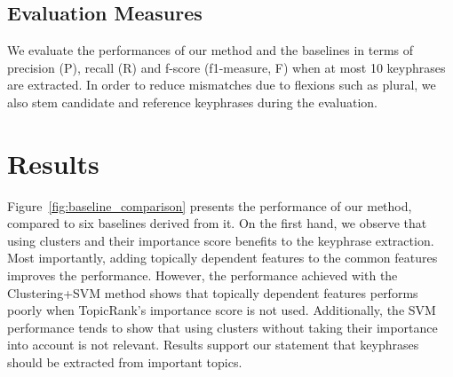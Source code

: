   \subsection{Evaluation Measures}
  \label{subsec:evaluation_measures}
    We evaluate the performances of our method and the baselines in terms of
    precision (P), recall (R) and f-score (f1-measure, F) when at most 10
    keyphrases are extracted. In order to reduce mismatches due to flexions such
    as plural, we also stem candidate and reference keyphrases during the
    evaluation.

\section{Results}
\label{sec:results}
  Figure~\ref{fig:baseline_comparison} presents the performance of our method,
  compared to six baselines derived from it. On the first hand, we observe that
  using clusters and their importance score benefits to the keyphrase
  extraction. Most importantly, adding topically dependent features to the
  common features improves the performance. However, the performance achieved
  with the Clustering+SVM method shows that topically dependent features
  performs poorly when Topic\-Rank's importance score is not used. Additionally,
  the SVM performance tends to show that using clusters without taking their
  importance into account is not relevant. Results support our statement that
  keyphrases should be extracted from important topics.
